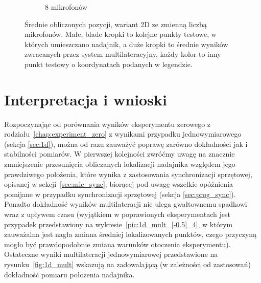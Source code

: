 \begin{figure}[H]
\begin{subfigure}{.5\textwidth}
        \caption{8 mikrofonów}
        \label{pic:2d_8_num_mult}
    \end{subfigure}
    \caption[Wyniki eksperymentu dla wersji 2D ze zmienną liczbą mikrofonów]{Średnie obliczonych pozycji, wariant 2D ze zmienną liczbą mikrofonów. Małe, blade kropki to kolejne punkty testowe, w których umieszczano nadajnik, a duże kropki to średnie wyników zwracanych przez system multilateracyjny, każdy kolor to inny punkt testowy o koordynatach podanych w legendzie.}
    \label{fig:2d_num_mult}
\end{figure}

\section{Interpretacja i wnioski}

Rozpoczynając od porównania wyników eksperymentu zerowego z rodziału~\ref{chap:experiment_zero} z wynikami przypadku jednowymiarowego (sekcja \ref{sec:1d}), można od razu zauważyć poprawę zarówno dokładności jak i stabilności pomiarów. W pierwszej kolejności zwróćmy uwagę na znacznie zmniejszenie przesunięcia obliczanych lokalizacji nadajnika względem jego prawdziwego położenia, które wynika z zastosowania synchronizacji sprzętowej, opisanej w sekcji~\ref{sec:mic_sync}, biorącej pod uwagę wszelkie opóźnienia pomijane w przypadku synchronizacji sprzętowej (sekcja \ref{sec:prog_sync}). Ponadto dokładność wyników multilateracji nie ulega gwałtownemu spadkowi wraz z upływem czasu (wyjątkiem w poprawionych eksperymentach jest przypadek przedstawiony na wykresie~\ref{pic:1d_mult_[-0.5]_4}, w którym zauważalna jest nagła zmiana średniej lokalizowanych punktów, czego przyczyną mogło być prawdopodobnie zmiana warunków otoczenia eksperymentu). Ostateczne wyniki multilateracji jednowymiarowej przedstawione na rysunku~\ref{fig:1d_mult} wskazują na zadowalającą (w zależności od zastosowań) dokładność pomiaru położenia nadajnika.

